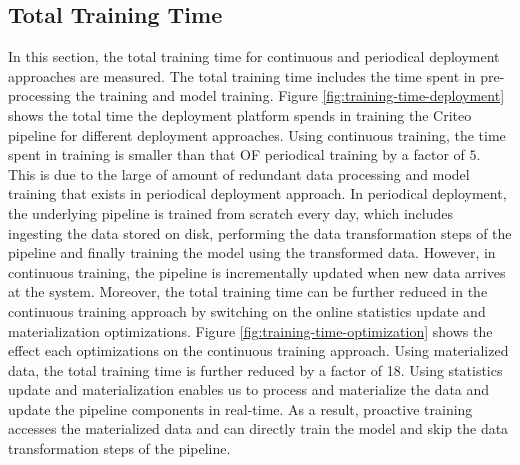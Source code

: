 \subsection{Total Training Time}
In this section, the total training time for continuous and periodical deployment approaches are measured.
The total training time includes the time spent in pre-processing the training and model training.
Figure \ref{fig:training-time-deployment} shows the total time the deployment platform spends in training the Criteo pipeline for different deployment approaches.
Using continuous training, the time spent in training is smaller than that OF periodical training by a factor of $5$.
This is due to the large of amount of redundant data processing and model training that exists in periodical deployment approach.
In periodical deployment, the underlying pipeline is trained from scratch every day, which includes ingesting the data stored on disk, performing the data transformation steps of the pipeline and finally training the model using the transformed data.
However, in continuous training, the pipeline is incrementally updated when new data arrives at the system.
Moreover, the total training time can be further reduced in the continuous training approach by switching on the online statistics update and materialization optimizations.
Figure \ref{fig:training-time-optimization} shows the effect each optimizations on the continuous training approach.
Using materialized data, the total training time is further reduced by a factor of 18.
Using statistics update and materialization enables us to process and materialize the data and update the pipeline components in real-time.
As a result, proactive training accesses the materialized data and can directly train the model and skip the data transformation steps of the pipeline.

